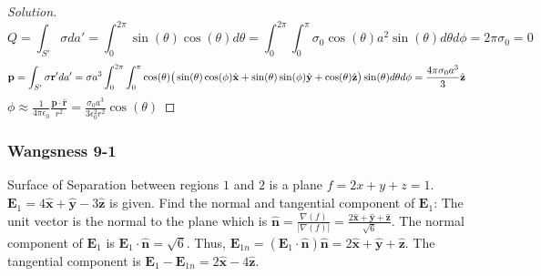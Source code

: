 \documentclass[crop=false,class=article,oneside]{standalone}
\begin{document}
        \begin{proof}[Solution]
        \begin{equation*}
            Q = \int_{S'} \sigma da'= \int_{0}^{2\pi} \sin(\theta)\cos(\theta)d\theta = \int_{0}^{2\pi} \int_{0}^{\pi} \sigma_{0} \cos(\theta) a^2 \sin(\theta) d\theta d\phi = 2\pi \sigma_{0} = 0
        \end{equation*}
        \begin{equation*}
            \mathbf{p}=\int_{S'}\sigma \mathbf{r}' da'\\
            =\sigma a^{3}\int_{0}^{2\pi} \int_{0}^{\pi} \cos(\theta) \big(\sin(\theta) \cos(\phi) \hat{\mathbf{x}} + \sin(\theta)\sin(\phi) \hat{\mathbf{y}} + \cos(\theta) \hat{\mathbf{z}}\big)\sin(\theta)d\theta d\phi\\
            =\frac{4\pi \sigma_0 a^3}{3} \hat{\mathbf{z}}
        \end{equation*}
        $\phi \approx \frac{1}{4\pi \epsilon_0} \frac{\mathbf{p}\cdot \hat{\mathbf{r}}}{r^2} = \frac{\sigma_0 a^3}{3\epsilon_0^2 r^2}\cos(\theta)$
        \end{proof}
        \subsubsection{Wangsness 9-1}
        Surface of Separation between regions $1$ and $2$ is a plane $f=2x+y+z=1$. $\mathbf{E}_1 = 4\hat{\mathbf{x}}+\hat{\mathbf{y}}-3\hat{\mathbf{z}}$ is given. Find the normal and tangential component of $\mathbf{E}_1$: The unit vector is the normal to the plane which is $\hat{\mathbf{n}}=\frac{\nabla(f)}{|\nabla(f)|} = \frac{2\hat{\mathbf{x}}+\hat{\mathbf{y}}+\hat{\mathbf{z}}}{\sqrt{6}}$. The normal component of $\mathbf{E}_1$ is $\mathbf{E}_1 \cdot \hat{\mathbf{n}} = \sqrt{6}$. Thus, $\mathbf{E}_{1n} = (\mathbf{E}_1 \cdot \hat{\mathbf{n}})\hat{\mathbf{n}} = 2\hat{\mathbf{x}}+\hat{\mathbf{y}}+\hat{\mathbf{z}}$. The tangential component is $\mathbf{E}_1 - \mathbf{E}_{1n} = 2\hat{\mathbf{x}}-4\hat{\mathbf{z}}$.
\end{document}

